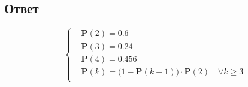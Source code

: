 \documentclass{article}
\begin{document}
\subsection*{Ответ}
\begin{equation*}
\left\{
\begin{aligned}
& \mathbf{P}(2) \! = \! 0.6 \\
& \mathbf{P}(3) \! = \! 0.24 \\
& \mathbf{P}(4) \! = \! 0.456 \\
& \mathbf{P}(k) \! = \! \Big( 1 \! - \! \mathbf{P}(k \! - \! 1) \Big) \! \cdot \! \mathbf{P} (2) \quad \forall k \! \geqslant \! 3 \\
\end{aligned}
\right.
\end{equation*}
\end{document}
